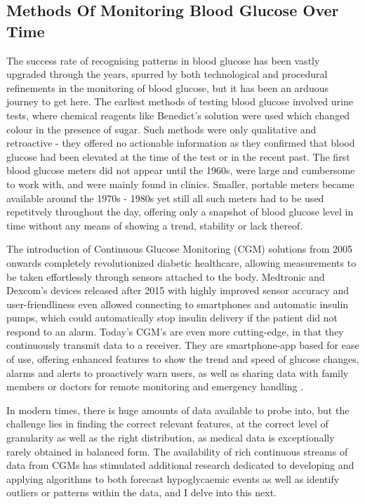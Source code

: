 \subsection{Methods Of Monitoring Blood Glucose Over Time}

\noindent The success rate of recognising patterns in blood glucose has been vastly upgraded through the years, spurred by both technological and procedural refinements in the monitoring of blood glucose, but it has been an arduous journey to get here. The earliest methods of testing blood glucose involved urine tests, where chemical reagents like Benedict's solution were used which changed colour in the presence of sugar. Such methods were only qualitative and retroactive - they offered no actionable information as they confirmed that blood glucose had been elevated at the time of the test or in the recent past. The first blood glucose meters did not appear until the 1960s, were large and cumbersome to work with, and were mainly found in clinics. Smaller, portable meters became available around the 1970s - 1980s yet still all such meters had to be used repetitvely throughout the day, offering only a snapshot of blood glucose level in time without any means of showing a trend, stability or lack thereof. 

\vspace{5pt}
\noindent The introduction of Continuous Glucose Monitoring (CGM) solutions from 2005 onwards completely revolutionized diabetic healthcare, allowing measurements to be taken effortlessly through sensors attached to the body. Medtronic and Dexcom's devices released after 2015 with highly improved sensor accuracy and user-friendliness even allowed connecting to smartphones and automatic insulin pumps, which could automatically stop insulin delivery if the patient did not respond to an alarm. Today's CGM's are even more cutting-edge, in that they continuously transmit data to a receiver. They are smartphone-app based for ease of use, offering enhanced features to show the trend and speed of glucose changes, alarms and alerts to proactively warn users, as well as sharing data with family members or doctors for remote monitoring and emergency handling \cite{evolutionOfCGM}. 

\vspace{5pt}
\noindent In modern times, there is huge amounts of data available to probe into, but the challenge lies in finding the correct relevant features, at the correct level of granularity as well as the right distribution, as medical data is exceptionally rarely obtained in balanced form. The availability of rich continuous streams of data from CGMs has stimulated additional research dedicated to developing and applying algorithms to both forecast hypoglycaemic events as well as identify outliers or patterns within the data, and I delve into this next.

